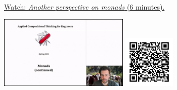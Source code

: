 
\begin{minipage}{10cm}
    \href{https://act4e-spring21.netlify.app/videos/spring2021-monads-b:another-persp-mon.html}{Watch: \emph{Another perspective on monads} (6 minutes).}
        
    \href{https://act4e-spring21.netlify.app/videos/spring2021-monads-b:another-persp-mon.html}{\includegraphics[height=3.5cm]{spring2021-monads-b:another-persp-mon/thumbnails.jpg}}
    \href{https://act4e-spring21.netlify.app/videos/spring2021-monads-b:another-persp-mon.html}{\includegraphics[height=2.5cm]{spring2021-monads-b:another-persp-mon/qrcode.png}}
\end{minipage}

